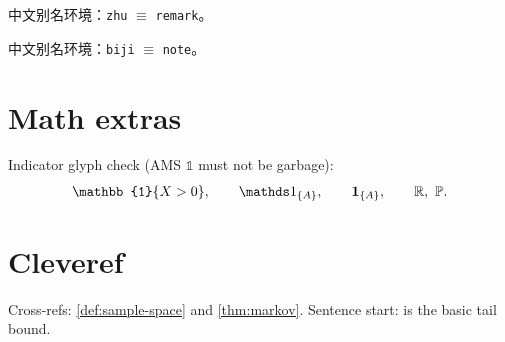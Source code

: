 \documentclass[11pt,a4paper]{article}
\begin{document}
\begin{zhu}
中文别名环境：\texttt{zhu} $\equiv$ \texttt{remark}。
\end{zhu}

\begin{biji}
中文别名环境：\texttt{biji} $\equiv$ \texttt{note}。
\end{biji}

\section{Math extras}
Indicator glyph check (AMS $\mathbb{1}$ must not be garbage):
\[
\mathbb{1}\{X>0\},\qquad \bbone_{\{A\}},\qquad \ind_{\{A\}},\qquad \mathbb{R},\ \mathbb{P}.
\]

\section{Cleveref}
Cross-refs: \cref{def:sample-space} and \cref{thm:markov}.
Sentence start:  is the basic tail bound.
\end{document}
